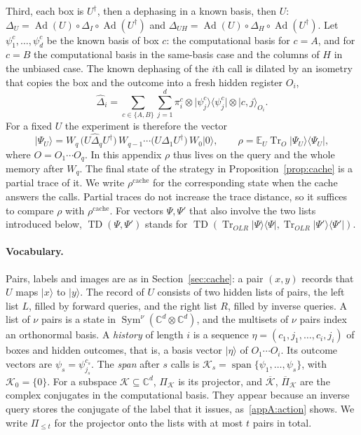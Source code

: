 \documentclass[11pt,letterpaper]{article}
\theoremstyle{definition}\newtheorem{definition}[theorem]{Definition}
\newcommand{\C}{\mathbb C}
\newcommand{\E}{\mathbb E}
\newcommand{\Tr}{\operatorname{Tr}}
\newcommand{\TD}{\operatorname{TD}}
\newcommand{\Ad}{\operatorname{Ad}}
\newcommand{\ket}[1]{\lvert#1\rangle}
\newcommand{\bra}[1]{\langle#1\rvert}
\newcommand{\proj}[1]{\ket{#1}\!\bra{#1}}
\begin{document}
Third, each box is $U^\dagger$, then a dephasing in a known basis,
then $U$:
$\Delta_U=\Ad(U)\circ\Delta_I\circ\Ad(U^\dagger)$ and
$\Delta_{UH}=\Ad(U)\circ\Delta_H\circ\Ad(U^\dagger)$. Let
$\psi^c_1,\dots,\psi^c_d$ be the known basis of box $c$: the
computational basis for $c=A$, and for $c=B$ the computational basis
in the same-basis case and the columns of $H$ in the unbiased case. The known
dephasing of the $i$th call is dilated by an isometry that copies the
box and the outcome into a fresh hidden register $O_i$,
\[
 \widehat\Delta_i=\sum_{c\in\{A,B\}}\sum_{j=1}^d
   \pi^c_i\otimes\proj{\psi^c_j}\otimes\ket{c,j}_{O_i}.
\]
For a fixed $U$ the experiment is therefore the vector
\begin{equation}\label{appA:experiment}
 \ket{\Psi_U}=W_q\,\bigl(U\widehat\Delta_qU^\dagger\bigr)\,W_{q-1}\cdots
   \bigl(U\widehat\Delta_1U^\dagger\bigr)\,W_0\ket0,
 \qquad
 \rho=\E_U\Tr_{O}\proj{\Psi_U},
\end{equation}
where $O=O_1\cdots O_q$. In this appendix $\rho$ thus lives on the
query and the whole memory after $W_q$. The final state of the strategy
in Proposition~\ref{prop:cache} is a partial trace of it. We write
$\rho^{\mathrm{cache}}$ for the corresponding state when the cache
answers the calls. Partial traces do not increase the trace distance,
so it suffices to compare $\rho$ with $\rho^{\mathrm{cache}}$. For vectors $\Psi,\Psi'$ that also involve
the two lists introduced below, $\TD(\Psi,\Psi')$ stands for
$\TD(\Tr_{OLR}\proj\Psi,\Tr_{OLR}\proj{\Psi'})$.

\paragraph{Vocabulary.}
Pairs, labels and images are as in Section~\ref{sec:cache}: a pair
$(x,y)$ records that $U$ maps $\ket x$ to $\ket y$. The record of $U$
consists of two hidden lists of pairs, the left list $L$, filled by
forward queries, and the right list $R$, filled by inverse queries. A
list of $\nu$ pairs is a state in
$\operatorname{Sym}^\nu(\C^d\otimes\C^d)$, and the multisets of $\nu$
pairs index an orthonormal basis. A
\emph{history} of length $i$ is a sequence
$\eta=(c_1,j_1,\dots,c_i,j_i)$ of boxes and hidden outcomes, that is, a
basis vector $\ket\eta$ of $O_1\cdots O_i$. Its outcome vectors are
$\psi_s=\psi^{c_s}_{j_s}$. The \emph{span} after $s$ calls is
$\mathcal K_s=\operatorname{span}\{\psi_1,\dots,\psi_s\}$, with
$\mathcal K_0=\{0\}$. For a subspace $\mathcal K\subseteq\C^d$,
$\Pi_{\mathcal K}$ is its projector, and $\overline{\mathcal K}$,
$\overline\Pi_{\mathcal K}$ are the complex conjugates in the
computational basis. They appear because an inverse query stores the
conjugate of the label that it issues, as~\eqref{appA:action} shows. We
write $\Pi_{\le t}$ for the projector onto the lists with at most $t$
pairs in total.
\end{document}

